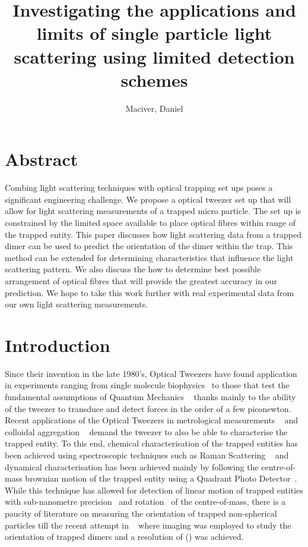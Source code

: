 \documentclass[11pt]{article}
\title{Investigating the applications and limits of single particle light scattering using limited detection schemes}
\author{Maciver, Daniel}
\begin{document}
	
	\maketitle
	
	\section*{Abstract}
	Combing light scattering techniques with optical trapping set ups poses a significant engineering challenge. We propose a optical tweezer set up that will allow for light scattering measurements of a trapped micro particle. The set up is constrained by the limited space available to place optical fibres within range of the trapped entity. This paper discusses how light scattering data from a trapped dimer can be used to predict the orientation of the dimer within the trap. This method can be extended for determining characteristics that influence the light scattering pattern. We also discuss the how to determine best possible arrangement of optical fibres that will provide the greatest accuracy in our prediction. We hope to take this work further with real experimental data from our own light scattering measurements. 
	
	\section*{Introduction}
	Since their invention in the late 1980's, Optical Tweezers have found application in experiments ranging from single molecule biophysics~\cite{Wang 2021} to those that test the fundamental assumptions of Quantum Mechanics ~\cite{Duan 2013} thanks mainly to the ability of the tweezer to transduce and detect forces in the order of a few piconewton. Recent applications of the Optical Tweezers in metrological measurements ~\cite{Scott Waitukaitis} and colloidal aggregation ~\cite{Optical Binding} demand the tweezer to also be able to characterise  the trapped entity. To this end, chemical characterisation of the trapped entities has been achieved using spectroscopic techniques such as Raman Scattering ~\cite{P K Gupta} and dynamical characterisation has been achieved mainly by following the centre-of-mass brownian motion of the trapped entity using a Quadrant Photo Detector~\cite{Alexander Rohrbach}. While this technique has allowed for detection of linear motion of trapped entities  with sub-nanometre precision~\cite{Alexander Rohrbach} and  rotation~\cite{recent paper} of the centre-of-mass, there is a paucity of literature on measuring the orientation of trapped non-spherical particles till the recent attempt in ~\cite{New Zealand paper} where imaging was employed to study the orientation of trapped dimers and a resolution of () was achieved.   
\end{document}
